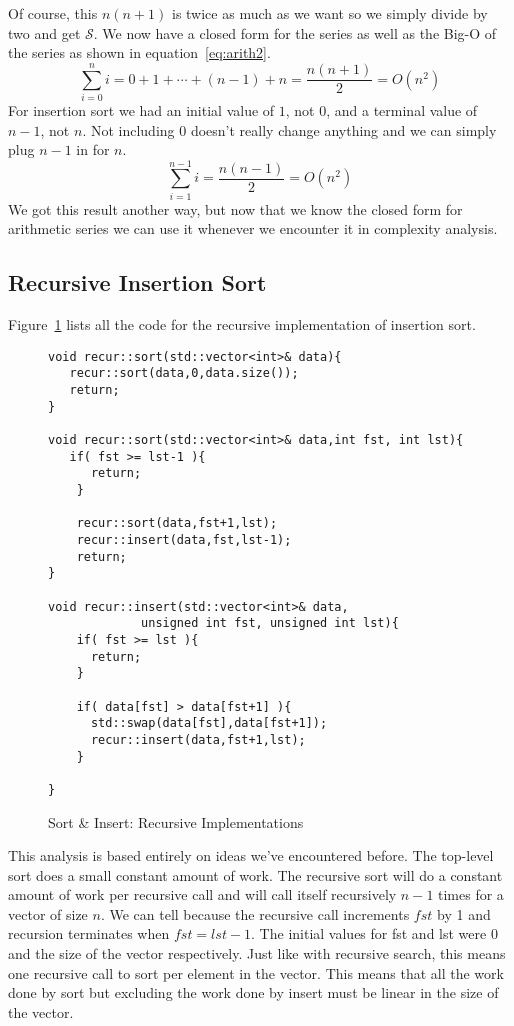 \documentclass[]{tufte-handout}
\begin{document}
Of course, this $n(n+1)$ is twice as much as we want so we simply divide by two and get $\mathcal{S}$. We now have a closed form for the series as well as the Big-O of the series as shown in equation~\ref{eq:arith2}.
\begin{equation}
\sum\limits_{i=0}^{n} i = 0 + 1 + \cdots +(n-1) + n = \dfrac{n(n+1)}{2} = O(n^2)
\label{eq:arith2}
\end{equation}
For insertion sort we had an initial value of $1$, not $0$, and a terminal value of $n-1$, not $n$. Not including $0$ doesn't really change anything and we can simply plug $n-1$ in for $n$.
\[
\sum\limits_{i=1}^{n-1} i = \dfrac{n(n-1)}{2} = O(n^2)
\]
We got this result another way, but now that we know the closed form for arithmetic series we can use it whenever we encounter it in complexity analysis.


\subsection{Recursive Insertion Sort}

Figure~\ref{code:isortrec} lists all the code for the recursive implementation of insertion sort.
\begin{figure}
\begin{lstlisting}
void recur::sort(std::vector<int>& data){
   recur::sort(data,0,data.size());
   return;
}

void recur::sort(std::vector<int>& data,int fst, int lst){
   if( fst >= lst-1 ){
      return;
    }

    recur::sort(data,fst+1,lst);
    recur::insert(data,fst,lst-1);
    return;
}

void recur::insert(std::vector<int>& data,
		     unsigned int fst, unsigned int lst){
    if( fst >= lst ){
      return;
    }

    if( data[fst] > data[fst+1] ){
      std::swap(data[fst],data[fst+1]);
      recur::insert(data,fst+1,lst);
    }

}
\end{lstlisting}
\label{code:isortrec}
\caption{Sort \& Insert: Recursive Implementations}
\end{figure}

This analysis is based entirely on ideas we've encountered before. The top-level sort does a small constant amount of work. The recursive sort will do a constant amount of work per recursive call and will call itself recursively $n-1$ times for a vector of size $n$. We can tell because the recursive call increments $fst$ by 1 and recursion terminates when $fst = lst-1$. The initial values for fst and lst were 0 and the size of the vector respectively. Just like with recursive search, this means one recursive call to sort per element in the vector. This means that all the work done by sort but excluding the work done by insert must be linear in the size of the vector.
\end{document}
